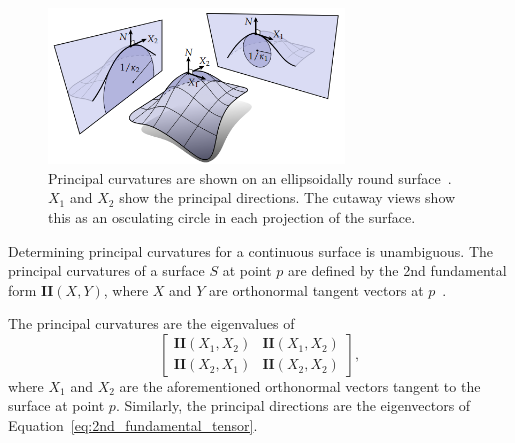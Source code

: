 \begin{figure}[htb]
	\centering
	\includegraphics[width=0.7\textwidth]{../resources/curvature/principal_curvatures.png}
	\caption{
Principal curvatures are shown on an ellipsoidally round surface~\cite{Digital_geom_proc_w_disc_ext_calc}.
$X_1$ and $X_2$ show the principal directions.
The cutaway views show this as an osculating circle in each projection of the surface.
}
	\label{fig:principal_k}
\end{figure}

Determining principal curvatures for a continuous surface is unambiguous.
The principal curvatures of a surface $S$ at point $p$ are defined by the 2nd fundamental form $\textbf{II}(X,Y)$, where $X$ and $Y$ are orthonormal tangent vectors at $p$~\cite{DiffGeo_curves_surfaces, Basic_diff_geo_of_surfaces, DDGAppIntro_17_smooth_k}.

The principal curvatures are the eigenvalues of
\begin{equation}\label{eq:2nd_fundamental_tensor}
	\begin{bmatrix}
		\textbf{II}(X_1, X_2) & \textbf{II}(X_1, X_2) \\
		\textbf{II}(X_2, X_1) & \textbf{II}(X_2, X_2)
	\end{bmatrix},
\end{equation}
where $X_1$ and $X_2$ are the aforementioned orthonormal vectors tangent to the surface at point $p$.
Similarly, the principal directions are the eigenvectors of Equation~\ref{eq:2nd_fundamental_tensor}.

